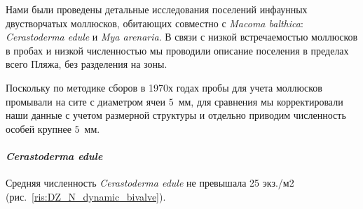 \medskip

Нами были проведены детальные исследования поселений инфаунных двустворчатых моллюсков, обитающих совместно с {\it Macoma balthica}: {\it Cerastoderma edule} и {\it Mya arenaria}. 
В связи с низкой встречаемостью моллюсков в пробах и низкой численностью мы проводили описание поселения в пределах всего Пляжа, без разделения на зоны.

Поскольку по методике сборов в 1970х годах пробы для учета моллюсков промывали на сите с диаметром ячеи $5$~мм, для сравнения мы корректировали наши данные с учетом размерной структуры и отдельно приводим численность особей крупнее $5$~мм.

\paragraph{\textit{Cerastoderma edule}}
Средняя численность {\it Cerastoderma edule} не превышала 25 экз./м2 (рис.~\ref{ris:DZ_N_dynamic_bivalve}). 
%
